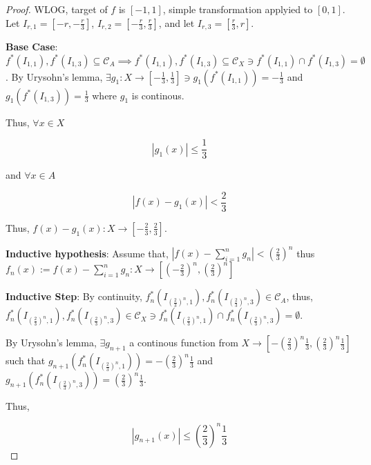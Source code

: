 \documentclass{article}
\newcommand*{\subeq}{\subseteq}
\newcommand*{\empset}{\emptyset}
\newcommand{\abs}[1]{\left\lvert #1\right\rvert}
\begin{document}
\begin{proof}
    WLOG, target of $f$ is $[-1, 1]$, simple transformation applyied to $[0, 1]$. Let $I_{r, 1} = [-r, -\frac{r}{3}]$, $I_{r, 2} = [-\frac{r}{3}, \frac{r}{3}]$, and let $I_{r, 3} = [\frac{r}{3}, r]$. 
    
    \textbf{Base Case}: $f^*(I_{1, 1}), f^*(I_{1, 3}) \subeq \mathcal{C}_A \implies f^*(I_{1, 1}), f^*(I_{1, 3}) \subeq \mathcal{C}_X \ni f^*(I_{1, 1}) \cap f^*(I_{1, 3}) = \empset$. By Urysohn's lemma, $\exists g_1 : X \to [-\frac{1}{3}, \frac{1}{3}] \ni g_1(f^*(I_{1, 1})) = -\frac{1}{3}$ and $g_1(f^*(I_{1, 3})) = \frac{1}{3}$ where $g_1$ is continous. 
    
    Thus, $\forall x \in X$ 

    \begin{equation*}
        \abs{g_1(x)} \leq \frac{1}{3}
    \end{equation*}

    and $\forall x \in A$ 

    \begin{equation*}
        \abs{f(x) - g_1(x)} < \frac{2}{3}
    \end{equation*}

    Thus, $f(x) - g_1(x): X \to [-\frac{2}{3}, \frac{2}{3}]$. 
    
    \textbf{Inductive hypothesis}: Assume that, $\abs{f(x) - \sum_{i = 1}^{n} g_n} < (\frac{2}{3})^n$ thus $f_{n}(x) := f(x) - \sum_{i = 1}^{n} g_n : X \to [(-\frac{2}{3})^n, (\frac{2}{3})^n]$
    
    \textbf{Inductive Step}: By continuity, $f_{n}^*\left(I_{\left(\frac{2}{3}\right) ^n, 1}\right), f_{n}^*\left(I_{\left(\frac{2}{3}\right) ^n, 3}\right) \in \mathcal{C}_A$, thus, $f_{n}^*\left(I_{\left(\frac{2}{3}\right) ^n, 1}\right), f_{n}^*\left(I_{\left(\frac{2}{3}\right) ^n, 3}\right) \in \mathcal{C}_X \ni f_{n}^*\left(I_{\left(\frac{2}{3}\right) ^n, 1}\right) \cap f_{n}^*\left(I_{\left(\frac{2}{3}\right) ^n, 3}\right) = \empset$. 
    
    By Urysohn's lemma, $\exists g_{n + 1}$ a continous function from $X \to [-(\frac{2}{3})^n\frac{1}{3}, (\frac{2}{3})^n\frac{1}{3}]$ such that $g_{n + 1}\left(f_{n}^*\left(I_{\left(\frac{2}{3}\right) ^n, 1}\right)\right) = -(\frac{2}{3})^n\frac{1}{3}$ and $g_{n + 1}\left(f_{n}^*\left(I_{\left(\frac{2}{3}\right) ^n, 3}\right)\right) = (\frac{2}{3})^n\frac{1}{3}$. 

    Thus, 

    \[\abs{g_{n + 1}(x)} \leq \left(\frac{2}{3}\right)^n\frac{1}{3}\]


\end{proof}
\end{document}

